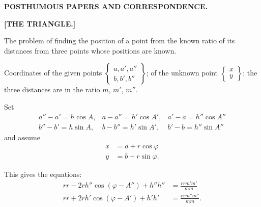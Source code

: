 \begin{center}
\textbf{\Large POSTHUMOUS PAPERS AND CORRESPONDENCE.}\par\bigskip
\textbf{[THE TRIANGLE.]}
\end{center}
\bigskip

The problem of finding the position of a point from the known ratio of its distances from three points whose positions are known.

Coordinates of the given points $\left\{\begin{array}{c}a,a',a''\\b,b',b''\end{array}\right\}$; of the unknown point $\left\{\begin{array}{c}x\\y\end{array}\right\}$; the three distances are in the ratio $m$, $m'$, $m''$.


Set
\[
\begin{array}{lll}
a''-a'=h\cos A,&a-a''=h'\cos A',&a'-a=h''\cos A''\\
b''-b'=h\sin A,&b-b''=h'\sin A',&b'-b=h''\sin A''
\end{array}
\]
\noindent and assume
\[
\begin{aligned}
x&=a+r\cos\varphi\\
y&=b+r\sin\varphi.
\end{aligned}
\]

This gives the equations:
\[
\begin{aligned}
rr-2rh''\cos(\varphi-A'')+h''h''&=\frac{rrm'm'}{mm}\\
rr+2rh'\cos(\varphi-A')+h'h'&=\frac{rrm''m''}{mm}.
\end{aligned}
\]
\begin{center}\end{center}
